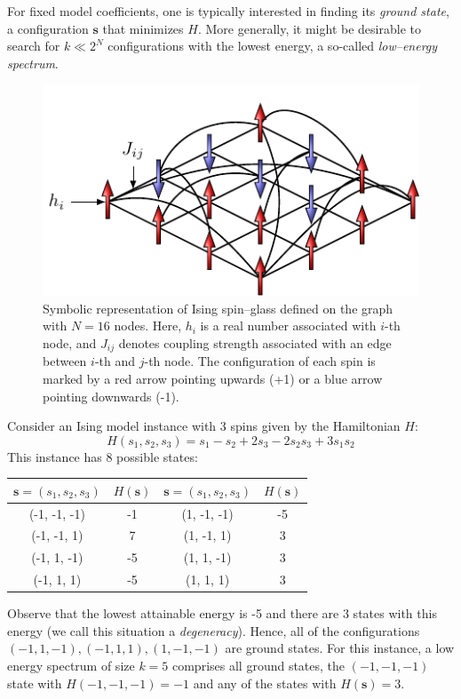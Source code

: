 For fixed model coefficients, one is typically interested in finding its \emph{ground state}, a
configuration $\mathbf{s}$ that minimizes $H$. More generally, it might be desirable to search for
$k \ll 2^N$ configurations with the lowest energy, a so-called \emph{low--energy spectrum}.

\begin{figure}[H]
    \centering
    \includegraphics{figures/spins.pdf}
    \caption{Symbolic representation of Ising spin--glass defined on the graph with $N=16$ nodes. Here, $h_i$ is a real number associated with $i$-th node, and $J_{ij}$ denotes coupling strength associated with an edge between $i$-th and $j$-th node. The configuration of each spin is marked by a red arrow pointing upwards (+1) or a blue arrow pointing downwards (-1).}
    \label{fig:my_label}
\end{figure}

\begin{example}
Consider an Ising model instance with 3 spins given by the Hamiltonian $H$:
\begin{equation}
H(s_1, s_2, s_3) = s_1 - s_2 +2s_3 - 2s_2s_3 + 3s_1s_2
\end{equation}
This instance has 8 possible states:

\begin{table}[h]
    \begin{center}
        \begin{tabular}{|c|c||c|c|}
        \hline
        $\mathbf{s}=(s_1, s_2, s_3)$ &
        $H(\mathbf{s})$ &
        $\mathbf{s}=(s_1, s_2, s_3)$ &
        $H(\mathbf{s})$\\\hline
        (-1, -1, -1) & -1 & (1, -1, -1) & -5\\ \hline
        (-1, -1, 1) & 7 & (1, -1, 1) & 3 \\ \hline
        (-1, 1, -1) & -5 & (1, 1, -1) & 3 \\ \hline
        (-1, 1, 1) & -5 & (1, 1, 1) & 3\\ \hline
        \end{tabular}
    \end{center}
\end{table}
Observe that the lowest attainable energy is -5 and there are 3 states with this energy (we call
this situation a \emph{degeneracy}). Hence, all of the configurations $(-1, 1, -1), (-1, 1, 1), (1,
-1, -1)$ are ground states. For this instance, a low energy spectrum of size $k=5$ comprises all
ground states, the $(-1, -1, -1)$ state with $H(-1, -1, -1) = -1$ and any of the states with
$H(\mathbf{s})=3$.
\end{example}

